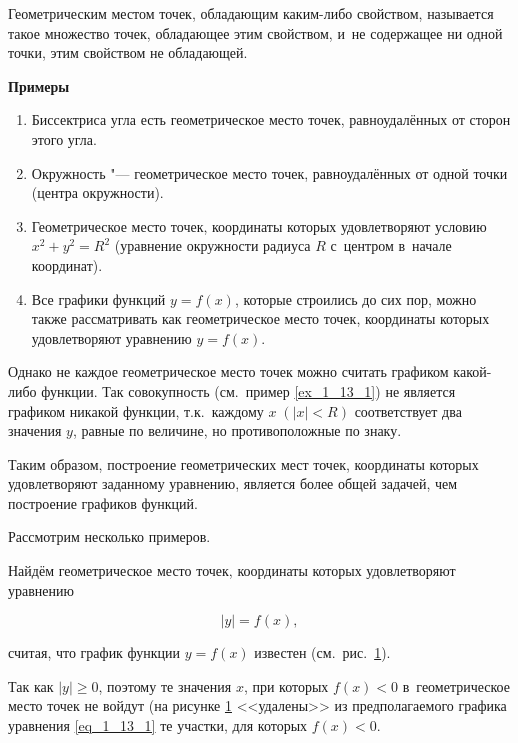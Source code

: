\begin{Def}
Геометрическим местом точек, обладающим каким-либо свойством, называется такое
множество точек, обладающее этим свойством, и~не содержащее ни одной точки,
этим свойством не обладающей.
\end{Def}

\textbf{Примеры}
\begin{enumerate}
\item Биссектриса угла есть геометрическое место точек, равноудалённых
от сторон этого угла.
\item Окружность "--- геометрическое место точек, равноудалённых от одной точки
(центра окружности).
\item Геометрическое место точек, координаты которых удовлетворяют условию
$x^{2} + y^{2} = R^{2}$ (уравнение окружности радиуса $R$ с~центром
в~начале координат).\label{ex_1_13_1}
\item Все графики функций $y = f(x)$, которые строились до сих пор,
можно также рассматривать как геометрическое место точек,
координаты которых удовлетворяют уравнению $y = f(x)$.
\end{enumerate}

Однако не каждое геометрическое место точек можно считать графиком какой-либо
функции. Так совокупность (см.\ пример \ref{ex_1_13_1}) не является графиком никакой функции,
т.к.\ каждому $x \;(|x| < R)$ соответствует два значения $y$, равные по величине,
но противоположные по знаку.

Таким образом, построение геометрических мест точек, координаты которых
удовлетворяют заданному уравнению, является более общей задачей,
чем построение графиков функций.

Рассмотрим несколько примеров.

Найдём геометрическое место точек, координаты которых удовлетворяют уравнению

\begin{equation}\label{eq_1_13_1}
|y| = f(x),
\end{equation}

считая, что график функции $y = f(x)$ известен (см.\ рис.\ \ref{fig_1_13_40}).

\begin{figure}\label{fig_1_13_40}
\end{figure}

Так как $|y| \geqslant 0$, поэтому те значения $x$, при которых
$f(x) < 0$ в~геометрическое место точек не войдут (на рисунке \ref{fig_1_13_40}
<<удалены>> из предполагаемого графика уравнения \eqref{eq_1_13_1}
те участки, для которых $f(x) < 0$.

